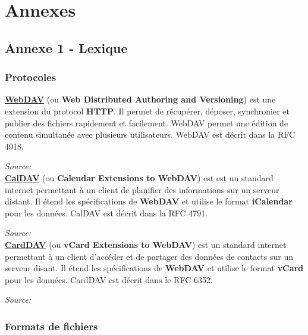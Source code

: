 \section*{Annexes}

\subsection*{Annexe 1 - Lexique}


\subsubsection*{Protocoles}

\underline{\textbf{WebDAV}} (ou \textbf{Web Distributed Authoring and Versioning}) est une extension du protocol \textbf{HTTP}. Il permet de récupérer, déposer, synchronier et publier des fichiers rapidement et facilement. WebDAV permet une édition de contenu simultanée avec plusieurs utilisateurs. WebDAV est décrit dans la RFC 4918.

\textit{Source: }\\

\underline{\textbf{CalDAV}} (ou \textbf{Calendar Extensions to WebDAV}) est est un standard internet permettant à un client de planifier des informations sur un serveur distant. Il étend les spécifications de \textbf{WebDAV} et utilise le format \textbf{iCalendar} pour les données. CalDAV est décrit dans la RFC 4791.

\textit{Source: }\\

\underline{\textbf{CardDAV}} (ou \textbf{vCard Extensions to WebDAV}) est un standard internet permettant à un client d'accéder et de partager des données de contacts sur un serveur disant. Il étend les spécifications de \textbf{WebDAV} et utilise le format \textbf{vCard} pour les données. CardDAV est décrit dans le RFC 6352.

\textit{Source: }\\


\subsubsection*{Formats de fichiers}

